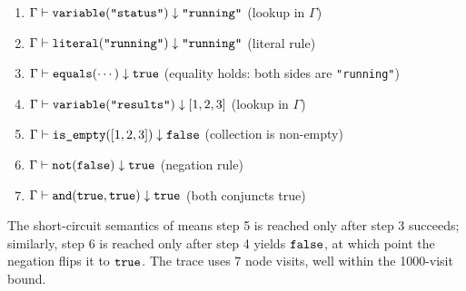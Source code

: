 \begin{enumerate}
\item $\Gamma \vdash \identifiable{variable}(\text{\texttt{"status"}}) \downarrow
  \text{\texttt{"running"}}$ \quad (lookup in $\Gamma$)
\item $\Gamma \vdash \identifiable{literal}(\text{\texttt{"running"}}) \downarrow
  \text{\texttt{"running"}}$ \quad (literal rule)
\item $\Gamma \vdash \identifiable{equals}(\cdots) \downarrow \identifiable{true}$
  \quad (equality holds: both sides are \texttt{"running"})
\item $\Gamma \vdash \identifiable{variable}(\text{\texttt{"results"}}) \downarrow
  [1,2,3]$ \quad (lookup in $\Gamma$)
\item $\Gamma \vdash \identifiable{is\_empty}([1,2,3]) \downarrow \identifiable{false}$
  \quad (collection is non-empty)
\item $\Gamma \vdash \identifiable{not}(\identifiable{false}) \downarrow
  \identifiable{true}$ \quad (negation rule)
\item $\Gamma \vdash \identifiable{and}(\identifiable{true},
  \identifiable{true}) \downarrow \identifiable{true}$ \quad (both conjuncts true)
\end{enumerate}
The short-circuit semantics of  means step 5 is reached only
after step 3 succeeds; similarly, step 6 is reached only after step 4 yields
$\identifiable{false}$, at which point the negation flips it to $\identifiable{true}$.
The trace uses 7 node visits, well within the 1000-visit bound.